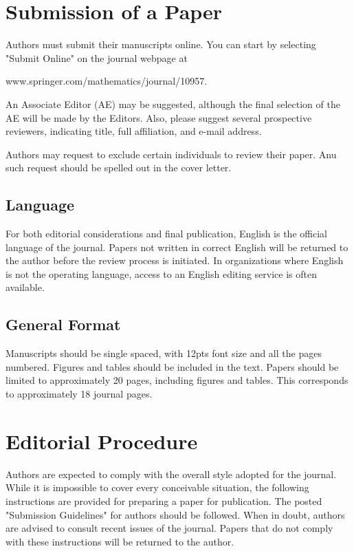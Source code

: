\documentclass[smallextended,referee,envcountsect,]{svjour3}
\begin{document}
\section{Submission of a Paper}

Authors must submit their manuscripts online.  You can start by selecting "Submit Online" on the journal webpage at

www.springer.com/mathematics/journal/10957.

An Associate Editor  (AE) may be suggested, although the final selection of the AE will be made by the Editors. Also, please suggest several prospective reviewers, indicating title, full affiliation, and e-mail address.

Authors may request to exclude certain individuals to review their paper. Anu such request should be spelled out in the cover letter.

\subsection{Language}

 For both editorial considerations and final publication, English is the official language of the journal. Papers not written in correct English will be returned to the author before the review process is initiated. In organizations where English is not the operating language, access to an English editing service is often available.

\subsection{General Format}

 Manuscripts should be single spaced, with 12pts font size and all the pages numbered.  Figures and tables should be included in the text.  Papers should be limited to approximately 20 pages,  including figures and tables. This corresponds to approximately 18 journal pages.

\section{Editorial Procedure}

Authors are expected to comply with the overall style adopted for the journal. While it is impossible to cover every conceivable situation, the following instructions are provided for preparing a paper for publication.  The posted "Submission Guidelines" for authors should be followed. When in doubt, authors are advised to consult recent issues of the journal. Papers that do not comply with these instructions will be returned to the author.
\end{document}
